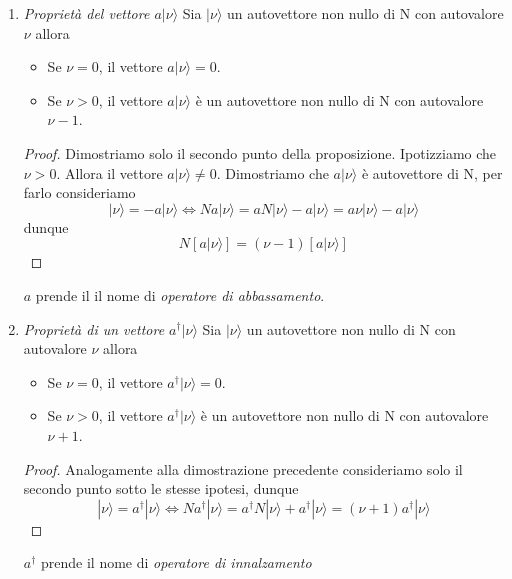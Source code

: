 \begin{enumerate}
\begin{proof}
	\end{proof}
	\item \textit{Propriet\`a del vettore $a|\nu \rangle$}
	\newline
	Sia $|\nu \rangle$ un autovettore non nullo di N con autovalore $\nu$ allora 
	\begin{itemize}
		\item Se $\nu = 0 $, il vettore $a|\nu\rangle = 0$.
		\item Se $\nu > 0 $, il vettore $a |\nu \rangle $ \`e un autovettore non nullo di N con autovalore $\nu-1$.
	\end{itemize}
	\begin{proof}
		Dimostriamo solo il secondo punto della proposizione. Ipotizziamo che $\nu > 0$. Allora il vettore $a |\nu \rangle \neq 0$. Dimostriamo che $a|\nu \rangle$ \`e autovettore di N, per farlo consideriamo
		\begin{equation*}
			[N,a]|\nu\rangle = -a |\nu \rangle \iff Na|\nu \rangle = aN | \nu \rangle - a|\nu \rangle  = a \nu |\nu \rangle - a |\nu \rangle 
		\end{equation*} 	
		dunque 
		\begin{equation*}
			N[a|\nu \rangle ] = (\nu-1)[a|\nu \rangle ]
		\end{equation*}
	\end{proof}
$a$ prende il il nome di \textit{operatore di abbassamento}.
	 \item \textit{Propriet\`a di un vettore $a^\dag|\nu \rangle $}
	 \newline
	  Sia $|\nu \rangle$ un autovettore non nullo di N con autovalore $\nu$ allora 
	\begin{itemize}
		\item Se $\nu = 0 $, il vettore $a^\dag|\nu\rangle = 0$.
		\item Se $\nu > 0 $, il vettore $a^\dag |\nu \rangle $ \`e un autovettore non nullo di N con autovalore $\nu+1$.
	\end{itemize}
	\begin{proof}
		Analogamente alla dimostrazione precedente consideriamo solo il secondo punto sotto le stesse ipotesi, dunque
		\begin{equation*}
			[N,a^\dag]|\nu \rangle = a^\dag |\nu \rangle \iff Na^\dag |\nu \rangle = a^\dag N |\nu \rangle + a^\dag |\nu \rangle = (\nu+1)a^\dag |\nu \rangle
		\end{equation*}
	\end{proof}
$a^\dag $ prende il nome di \textit{operatore di innalzamento}
\end{enumerate}

